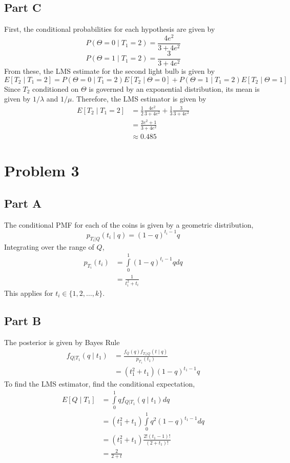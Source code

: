 \documentclass{article}
\begin{document}
\subsection*{Part C}

First, the conditional probabilities for each hypothesis are given by
$$ P(\Theta = 0 \mid T_1 = 2) = \frac{4 e^2}{3 + 4e^2} $$
$$ P(\Theta = 1 \mid T_1 = 2) = \frac{3}{3 + 4e^2} $$
From these, the LMS estimate for the second light bulb is given by
$$ E[T_2 \mid T_1 = 2] = P(\Theta = 0 \mid T_1 = 2) E[T_2 \mid \Theta = 0] +
P(\Theta = 1 \mid T_1 = 2) E[T_2 \mid \Theta = 1] $$
Since $T_2$ conditioned on $\Theta$ is governed by an exponential
distribution, its mean is given by $1/\lambda$ and $1/\mu$. Therefore, the
LMS estimator is given by
\begin{align*}
  E[T_2 \mid T_1 = 2] &= \frac{1}{2} \frac{4 e^2}{3 + 4e^2} + \frac{1}{3}
  \frac{3}{3 + 4e^2} \\
  &= \frac{2 e^2 + 1}{3 + 4e^2} \\
  &\approx 0.485
\end{align*}

\section*{Problem 3}

\subsection*{Part A}

The conditional PMF for each of the coins is given by a geometric
distribution,
$$ p_{T_i|Q}(t_i \mid q) = (1 - q)^{t_i - 1} q $$
Integrating over the range of $Q$,
\begin{align*}
  p_{T_i}(t_i) &= \int\limits_0^1 (1 - q)^{t_i - 1} q dq \\
  &= \frac{1}{t_i^2 + t_i}
\end{align*}
This applies for $t_i \in \{1, 2, \ldots, k\}$.

\subsection*{Part B}

The posterior is given by Bayes Rule
\begin{align*}
  f_{Q|T_1}(q \mid t_1) &= \frac{f_Q(q) f_{T_1|Q}(t \mid q)}{p_{T_1}(t_1)} \\
  &= (t_1^2 + t_1)(1 - q)^{t_1 - 1} q 
\end{align*}
To find the LMS estimator, find the conditional expectation,
\begin{align*}
  E[Q \mid T_1] &= \int\limits_0^1 q f_{Q|T_1}(q \mid t_1) dq \\
  &= (t_1^2 + t_1) \int\limits_0^1 q^2 (1 - q)^{t_1 - 1} dq \\
  &= (t_1^2 + t_1) \frac{2! (t_1 - 1)!}{(2 + t_1)!} \\
  &= \frac{2}{2 + t}
\end{align*}
\end{document}
